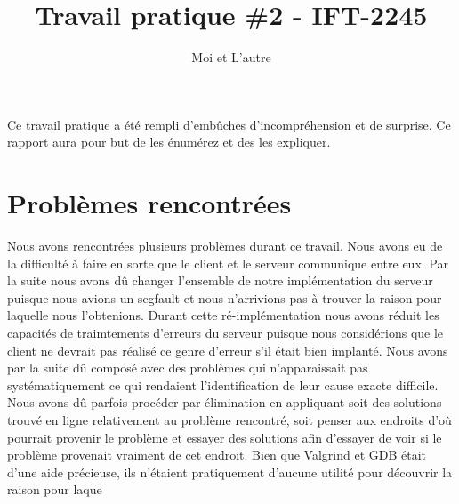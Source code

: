\documentclass[11pt]{article}
\title{Travail pratique \#2 - IFT-2245}
\author{Moi et L'autre}
\begin{document}
\maketitle

Ce travail pratique a été rempli d'embûches d'incompréhension et de surprise.  Ce rapport aura pour but de les énumérez et des les expliquer. 

\section{Problèmes rencontrées}

Nous avons rencontrées plusieurs problèmes durant ce travail. Nous avons eu de la difficulté à faire en sorte que le client et le serveur communique entre eux. Par la suite nous avons dû changer l'ensemble de notre implémentation du serveur puisque nous avions un segfault et nous n'arrivions pas à trouver la raison pour laquelle nous l'obtenions. Durant cette ré-implémentation nous avons réduit les capacités de traimtements d'erreurs du serveur puisque nous considérions que le client ne devrait pas réalisé ce genre d'erreur s'il était bien implanté. Nous avons par la suite dû composé avec des problèmes qui n'apparaissait pas systématiquement ce qui rendaient l'identification de leur cause exacte difficile. Nous avons dû parfois procéder par élimination en appliquant soit des solutions trouvé en ligne relativement au problème rencontré, soit penser aux endroits d'où pourrait provenir le problème et essayer des solutions afin d'essayer de voir si le problème provenait vraiment de cet endroit. Bien que Valgrind et GDB était d'une aide précieuse, ils n'étaient pratiquement d'aucune utilité pour découvrir la raison pour laque



\end{document}
